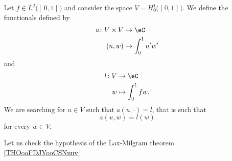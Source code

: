 \begin{example}
    Let \( f\in L^2\big( \mathopen] 0 , 1 \mathclose[ \big)\) and consider the space \( V=H_0^1\big( \mathopen] 0 , 1 \mathclose[ \big)\). We define the functionals defined by
        \begin{equation}
            \begin{aligned}
                a\colon V\times V&\to \eC \\
                (u,w)&\mapsto \int_0^1u'w' 
            \end{aligned}
        \end{equation}
        and
        \begin{equation}
            \begin{aligned}
                l\colon V&\to \eC \\
                w&\mapsto \int_0^1fw. 
            \end{aligned}
        \end{equation}
    We are searching for \( u\in V\) such that \( a(u,\cdot)=l\), that is such that
    \begin{equation}
        a(u,w)=l(w)
    \end{equation}
    for every \( w\in V\).

    Let us check the hypothesis of the Lax-Milgram theorem \ref{THOooFDJYooCSNnuv}.
        


\end{example}

